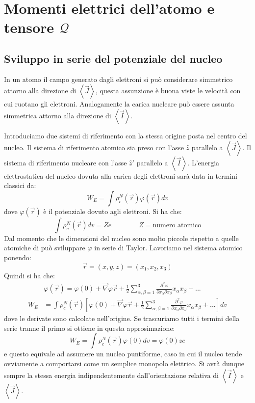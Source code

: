 \section{Momenti elettrici dell'atomo e tensore $\mathcal{Q}$}
\subsection{Sviluppo in serie del potenziale del nucleo}
In un atomo il campo generato dagli elettroni si può considerare simmetrico
attorno alla direzione di $\left\langle \vec{J} \right\rangle$, questa
assunzione è buona viste le velocità con cui ruotano gli elettroni. 
Analogamente
la carica nucleare può essere assunta simmetrica attorno alla direzione di
$\left\langle \vec{I} \right\rangle$.

Introduciamo due sistemi di riferimento con la stessa origine posta nel centro
del nucleo. Il sistema di riferimento atomico sia preso con l'asse $\hat{z}$
parallelo a $\left\langle \vec{J} \right\rangle$. Il sistema di riferimento
nucleare con l'asse $\hat{z}'$ parallelo a $\left\langle \vec{I} \right\rangle$.
L'energia elettrostatica del nucleo dovuta alla carica degli elettroni sarà 
data
in termini classici da:
\begin{equation}
W_E = \int \rho^N_c{(\vec{r})} \varphi{(\vec{r})} dv
\end{equation}
dove $\varphi{(\vec{r})}$ è il potenziale dovuto agli elettroni. Si ha che:
\begin{equation}
\int \rho^{N}_c{(\vec{r})} dv = Ze \qquad \qquad Z = \text{numero atomico}
\end{equation}
Dal momento che le dimensioni del nucleo sono molto piccole rispetto a quelle
atomiche di può sviluppare $\varphi$ in serie di Taylor. Lavoriamo nel sistema
atomico ponendo:
\begin{equation}
\vec{r} = (x, y,z) = (x_1, x_2, x_3)
\end{equation}
Quindi si ha che:
\begin{equation}
\begin{split}
&\varphi{(\vec{r})} = \varphi{(0)} + \vec{\nabla} \varphi \vec{r} + \frac{1}{2} 
\sum_{\alpha, \beta = 1}^3 \frac{\partial^2 \varphi}{\partial x_{\alpha} 
\partial x_{\beta}} x_{\alpha} x_{\beta} + ...\\
W_E &= \int \rho^{N}_{c} (\vec{r}) \left[ \varphi{(0)} + \vec{\nabla} \varphi 
\vec{r} + \frac{1}{2} \sum_{\alpha, \beta = 1}^3 \frac{\partial^2 
\varphi}{\partial x_{\alpha} \partial x_{\beta}} x_{\alpha} x_{\beta} + ... 
\right] dv
\end{split}
\end{equation}
dove le derivate sono calcolate nell'origine. Se trascuriamo tutti i termini
della serie tranne il primo si ottiene in questa approsimazione:
\begin{equation}
W_E = \int \rho^{N}_c{(\vec{r})} \varphi{(0)} dv = \varphi{(0)} z e
\end{equation}
e questo equivale ad assumere un nucleo puntiforme, caso in cui il nucleo tende
ovviamente a comportarsi come un semplice monopolo elettrico. Si avrà dunque
sempre la stessa energia indipendentemente dall'orientazione relativa di
$\left\langle \vec{I} \right\rangle$ e $\left\langle \vec{J} \right\rangle$.

